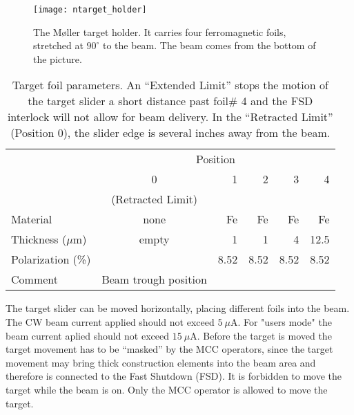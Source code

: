 {{  \begin{figure}[hbt]
      \begin{center}
          \texttt{[image: ntarget\_holder]}
      \end{center}
      \caption[M{\o}ller:target foils]{The M{\o}ller target holder. It carries
            four ferromagnetic foils, stretched at $90^\circ$ to the beam. The beam comes from the
            bottom of the picture.
            }
      \label{fig:moller_targ_rail} 
   \end{figure}  

\begin{table}[htb]
\begin{center}
\begin{tabular}{|l|c|r|r|r|r|} \hline
          & \multicolumn{5}{c|}{Position} \\ \cline{2-6}
          & 0               &  1  &  2  &  3   &  4   \\
          &  (Retracted Limit) &     &     &      &      \\
\hline 
  Material            & none & Fe & Fe & Fe & Fe \\
  Thickness ($\mu$m)   &  empty    & 1   &  1   & 4   & 12.5   \\
  Polarization (\%)      &           & 8.52 & 8.52 & 8.52 & 8.52 \\
  Comment             &  Beam  trough position &        &        &        &    \\
\hline
\end{tabular}
\end{center}
\caption[Moller target foils]{Target foil parameters. An ``Extended Limit'' stops the motion
of the target slider a short distance past foil\# 4 and the FSD interlock will not allow
for beam delivery. In the ``Retracted Limit'' (Position 0), the slider edge is several
inches away from the beam.}
\label{tab:moller-foils}
\end{table}
} %




\begin{safetyen}{0}{0}
The target slider can be moved horizontally, placing different foils
into the beam. The CW beam current applied should not exceed $5~\mu$A. For "users mode" the 
beam current aplied should not exceed $15~\mu$A. Before the target is moved the target
movement has to be ``masked'' by the MCC operators, since the target
movement may bring thick construction elements into the beam area
and therefore is connected to the Fast Shutdown (FSD). It is forbidden to move
the target  while the beam is on. Only the MCC operator is allowed to move the target.


\end{safetyen}}
